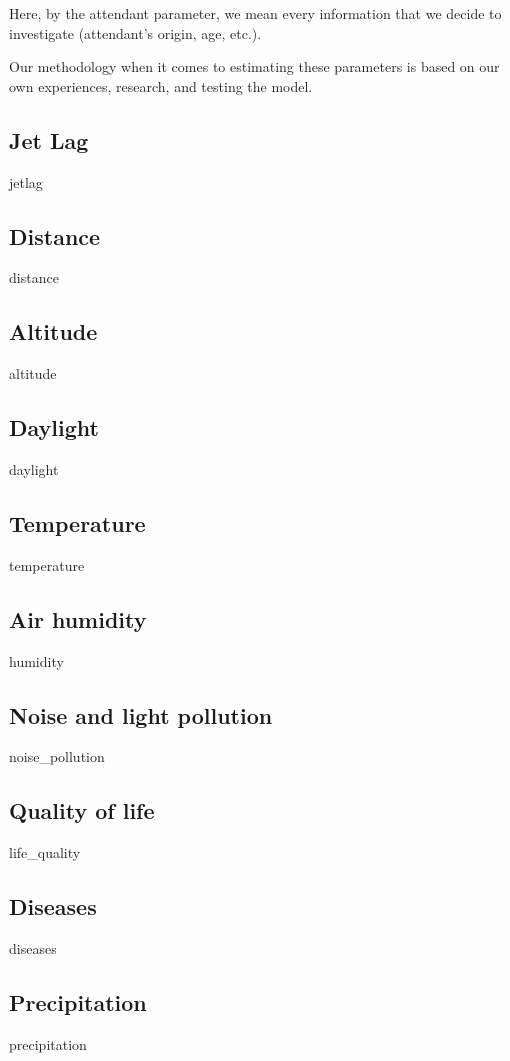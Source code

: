Here, by the attendant parameter, we mean every information that we decide to investigate (attendant's origin, age, etc.).

Our methodology when it comes to estimating these parameters is based on our own experiences, research, and testing the model. 

\subsection{Jet Lag}
{jetlag}

\subsection{Distance}
{distance}

\subsection{Altitude}
{altitude}

\subsection{Daylight}
{daylight}

\subsection{Temperature}
{temperature}

\subsection{Air humidity}
{humidity}

\subsection{Noise and light pollution}
{noise_pollution}

\subsection{Quality of life}
{life_quality}

\subsection{Diseases}
{diseases}

\subsection{Precipitation}
{precipitation}
